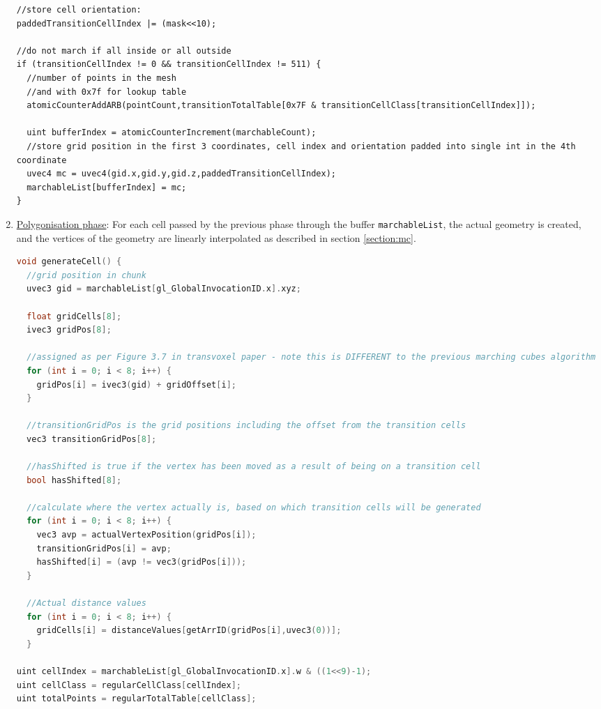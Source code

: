 \documentclass[11pt]{article}
\begin{document}
\begin{enumerate}
\begin{lstlisting}
//store cell orientation:
paddedTransitionCellIndex |= (mask<<10);

//do not march if all inside or all outside
if (transitionCellIndex != 0 && transitionCellIndex != 511) {
  //number of points in the mesh
  //and with 0x7f for lookup table
  atomicCounterAddARB(pointCount,transitionTotalTable[0x7F & transitionCellClass[transitionCellIndex]]);

  uint bufferIndex = atomicCounterIncrement(marchableCount);
  //store grid position in the first 3 coordinates, cell index and orientation padded into single int in the 4th coordinate
  uvec4 mc = uvec4(gid.x,gid.y,gid.z,paddedTransitionCellIndex);
  marchableList[bufferIndex] = mc;
}
\end{lstlisting}

\item \underline{Polygonisation phase}: For each cell passed by the previous phase through the buffer \texttt{marchableList}, the actual geometry is created, and the vertices of the geometry are linearly interpolated as described in section \ref{section:mc}. 

\begin{lstlisting}[language=C++,label={tv_poly_regular},caption={Code for generating the geometry in a regular cell.}]
void generateCell() {
  //grid position in chunk
  uvec3 gid = marchableList[gl_GlobalInvocationID.x].xyz;

  float gridCells[8];
  ivec3 gridPos[8];

  //assigned as per Figure 3.7 in transvoxel paper - note this is DIFFERENT to the previous marching cubes algorithm
  for (int i = 0; i < 8; i++) {
    gridPos[i] = ivec3(gid) + gridOffset[i];
  }

  //transitionGridPos is the grid positions including the offset from the transition cells
  vec3 transitionGridPos[8];

  //hasShifted is true if the vertex has been moved as a result of being on a transition cell
  bool hasShifted[8];

  //calculate where the vertex actually is, based on which transition cells will be generated
  for (int i = 0; i < 8; i++) {
    vec3 avp = actualVertexPosition(gridPos[i]);
    transitionGridPos[i] = avp;
    hasShifted[i] = (avp != vec3(gridPos[i]));
  }

  //Actual distance values
  for (int i = 0; i < 8; i++) {
    gridCells[i] = distanceValues[getArrID(gridPos[i],uvec3(0))];
  }

uint cellIndex = marchableList[gl_GlobalInvocationID.x].w & ((1<<9)-1);
uint cellClass = regularCellClass[cellIndex];
uint totalPoints = regularTotalTable[cellClass];


\end{lstlisting}
\end{enumerate}
\end{document}
